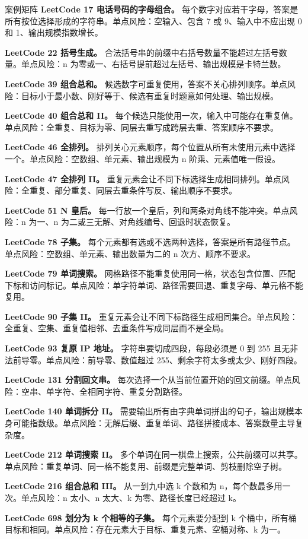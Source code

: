 \begin{principlebox}{案例矩阵}
\textbf{LeetCode 17 电话号码的字母组合。}
每个数字对应若干字母，答案是所有按位选择形成的字符串。单点风险：空输入、包含 7 或 9、输入中不应出现 0 和 1、输出规模指数增长。

\textbf{LeetCode 22 括号生成。}
合法括号串的前缀中右括号数量不能超过左括号数量。单点风险：n 为零或一、右括号提前超过左括号、输出规模是卡特兰数。

\textbf{LeetCode 39 组合总和。}
候选数字可重复使用，答案不关心排列顺序。单点风险：目标小于最小数、刚好等于、候选有重复时题意如何处理、输出规模。

\textbf{LeetCode 40 组合总和 II。}
每个候选只能使用一次，输入中可能存在重复值。单点风险：全重复、目标为零、同层去重写成跨层去重、答案顺序不要求。

\textbf{LeetCode 46 全排列。}
排列关心元素顺序，每个位置从所有未使用元素中选择一个。单点风险：空数组、单元素、输出规模为 n 阶乘、元素值唯一假设。

\textbf{LeetCode 47 全排列 II。}
重复元素会让不同下标选择生成相同排列。单点风险：全重复、部分重复、同层去重条件写反、输出顺序不要求。

\textbf{LeetCode 51 N 皇后。}
每一行放一个皇后，列和两条对角线不能冲突。单点风险：n 为一、n 为二或三无解、对角线编号、回退时状态恢复。

\textbf{LeetCode 78 子集。}
每个元素都有选或不选两种选择，答案是所有路径节点。单点风险：空数组、单元素、输出数量为二的 n 次方、顺序不要求。

\textbf{LeetCode 79 单词搜索。}
网格路径不能重复使用同一格，状态包含位置、匹配下标和访问标记。单点风险：单字符单词、路径需要回退、重复字母、单元格不能复用。

\textbf{LeetCode 90 子集 II。}
重复元素会让不同下标路径生成相同集合。单点风险：全重复、空集、重复值相邻、去重条件写成同层而不是全局。

\textbf{LeetCode 93 复原 IP 地址。}
字符串要切成四段，每段必须是 0 到 255 且无非法前导零。单点风险：前导零、数值超过 255、剩余字符太多或太少、刚好四段。

\textbf{LeetCode 131 分割回文串。}
每次选择一个从当前位置开始的回文前缀。单点风险：空串、单字符、全相同字符、重复分割路径。

\textbf{LeetCode 140 单词拆分 II。}
需要输出所有由字典单词拼出的句子，输出规模本身可能指数级。单点风险：无解后缀、重复单词、路径拼接成本、答案数量主导复杂度。

\textbf{LeetCode 212 单词搜索 II。}
多个单词在同一棋盘上搜索，公共前缀可以共享。单点风险：重复单词、同一格不能复用、前缀是完整单词、剪枝删除空子树。

\textbf{LeetCode 216 组合总和 III。}
从一到九中选 k 个数和为 n，每个数最多用一次。单点风险：n 太小、n 太大、k 为零、路径长度已经超过 k。

\textbf{LeetCode 698 划分为 k 个相等的子集。}
每个元素要分配到 k 个桶中，所有桶目标和相同。单点风险：存在元素大于目标、重复元素、空桶对称、k 为一。

\end{principlebox}

